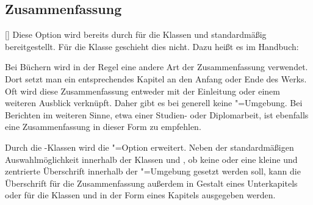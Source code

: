 \subsection{Zusammenfassung}
\begin{Declaration}{[\PSet]}%
\printdeclarationlist%
%
%
%
Diese Option wird bereits durch \KOMAScript{} für die Klassen  
und  standardmäßig bereitgestellt. Für die Klasse 
 geschieht dies nicht. Dazu heißt es im Handbuch:
%
\begin{quoting}
Bei Büchern wird in der Regel eine andere Art der Zusammenfassung verwendet. 
Dort setzt man ein entsprechendes Kapitel an den Anfang oder Ende des Werks. 
Oft wird diese Zusammenfassung entweder mit der Einleitung oder einem weiteren 
Ausblick verknüpft. Daher gibt es bei  generell keine 
"=Umgebung. Bei Berichten im weiteren Sinne, etwa einer 
Studien- oder Diplomarbeit, ist ebenfalls eine Zusammenfassung in dieser Form 
zu empfehlen.
\end{quoting}
%
Durch die \TUDScript-Klassen wird die "=Option erweitert. 
Neben der standardmäßigen Auswahlmöglichkeit innerhalb der Klassen 
 und , ob keine oder eine kleine und 
zentrierte Überschrift innerhalb der "=Umgebung gesetzt 
werden soll, kann die Überschrift für die Zusammenfassung außerdem in Gestalt 
eines Unterkapitels oder für die Klassen  und 
 in der Form eines Kapitels ausgegeben werden.


\end{Declaration}
